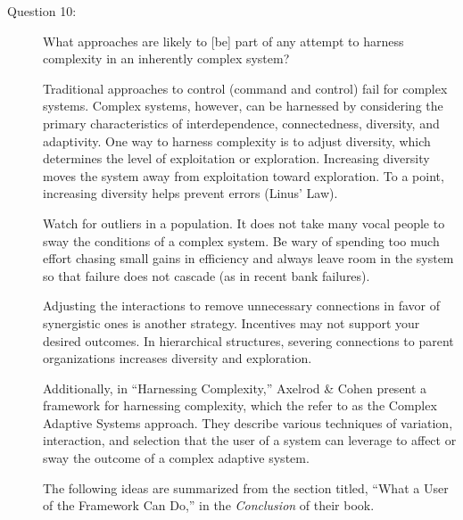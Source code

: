 \documentclass[letterpaper,10pt]{article}
\begin{document}
\begin{description}

\item[Question 10:]
What approaches are likely to [be] part of any attempt to harness complexity in an inherently complex system?

Traditional approaches to control (command and control) fail for complex systems.  Complex systems, however, can be harnessed by considering the primary characteristics of interdependence, connectedness, diversity, and adaptivity.  One way to harness complexity is to adjust diversity, which determines the level of exploitation or exploration.  Increasing diversity moves the system away from exploitation toward exploration.  To a point, increasing diversity helps prevent errors
(Linus' Law).

Watch for outliers in a population.  It does not take many vocal people to sway the conditions of a complex system.  Be wary of spending too much effort chasing small gains in efficiency and always leave room in the system so that failure does not cascade (as in recent bank failures).

Adjusting the interactions to remove unnecessary connections in favor of synergistic ones is another strategy.  Incentives may not support your desired outcomes.  In hierarchical structures, severing connections to parent organizations increases diversity and exploration.

Additionally, in ``Harnessing Complexity,'' Axelrod \& Cohen present a framework for harnessing complexity, which the refer to as the Complex Adaptive Systems approach.  They describe various techniques of variation, interaction, and selection that the user of a system can leverage to affect or sway the outcome of a complex adaptive system.

The following ideas are summarized from the section titled, ``What a User of the Framework Can Do,'' in the \emph{Conclusion} of their book.


\end{description}
\end{document}
